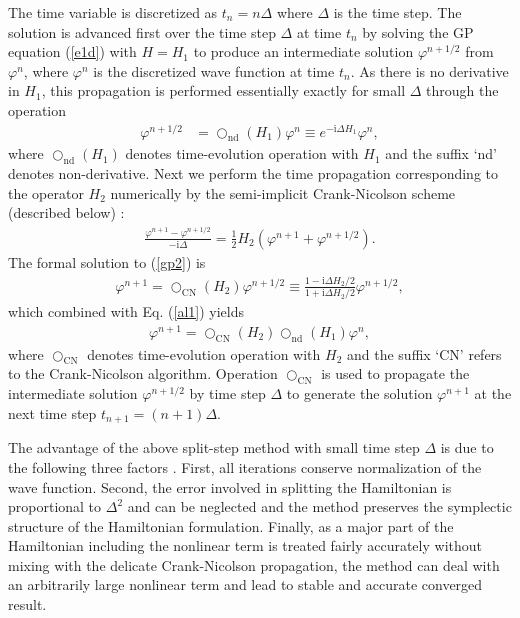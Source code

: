 \documentclass[onecolumn]{elsart3p}
\begin{document}
The time variable is discretized as $t_n=n\Delta$ where $\Delta$ is
the time step. The solution is advanced first over the time step
$\Delta$ at time $t_n$ by solving the GP equation (\ref{e1d}) with
$H=H_1$  to produce an intermediate solution $\varphi^{n+1/2}$ from
$\varphi^n$, where $\varphi^n$ is the discretized wave  function at
time $t_n$. As there is no derivative in $H_1$, this propagation is
performed essentially exactly for small $\Delta$ through the
operation
\begin{align}\label{al1}
\varphi^{n+1/2}
& = {\bigcirc}_{\mathrm{nd}}(H_1) \varphi^n \equiv  e^{-
\mbox{i}\Delta H_1}
\varphi^n,
\end{align}
where ${\bigcirc}_{\mathrm{nd}} (H_1)$ denotes time-evolution operation
with $H_1$ and the suffix `nd' denotes non-derivative. Next we perform
the time propagation corresponding to the operator $H_2$ numerically
by the semi-implicit Crank-Nicolson scheme (described below)
\cite{koonin}:
\begin{align}\label{gp2}
\frac{ \varphi^{n+1}- \varphi^{n+1/2}}{-\mbox{i}\Delta } =
\frac{1}{2}H_2(
\varphi^{n+1} + \varphi^{n+1/2}).
\end{align}
The formal solution to (\ref{gp2}) is
\begin{align}\label{gp3}
 \varphi^{n+1}= {\bigcirc}_{\mathrm{CN}}(H_2) \varphi^{n+1/2}
\equiv
\frac{1-\mbox{i}\Delta H_2/2  }{ 1+\mbox{i}\Delta
H_2/2 }
\varphi^{n+1/2},
\end{align}
which combined with Eq. (\ref{al1}) yields
\begin{align}\label{gp4}
 \varphi^{n+1}={\bigcirc}_{\mathrm{CN}}(H_2)   
{\bigcirc}_{\mathrm{nd}}(H_1)
\varphi^n,
\end{align}
where ${\bigcirc}_{\mathrm{CN}} $ denotes time-evolution operation with 
$H_2$
and   the suffix `CN' refers to the  Crank-Nicolson algorithm. Operation 
${\bigcirc}_{\mathrm{CN}} $ is used to propagate the intermediate 
solution  $ 
\varphi^{n+1/2} $ by time step $\Delta$  to generate the solution $ 
\varphi^{n+1}$ at the next time step $t_{n+1}=(n+1)\Delta$.

The advantage of the above split-step method with small time step $\Delta$ is
due to the following three factors \cite{ames,dtray}. First, all iterations
conserve normalization of the wave function. Second, the error involved in
splitting the Hamiltonian is proportional to $\Delta^2$ and can be neglected and
the method preserves the {symplectic} structure of the Hamiltonian formulation. 
Finally, as a major part of the Hamiltonian including the nonlinear term is
treated fairly accurately without mixing with the delicate Crank-Nicolson
propagation, the method can deal with an arbitrarily large nonlinear term and
lead to stable and accurate converged result.
\end{document}
